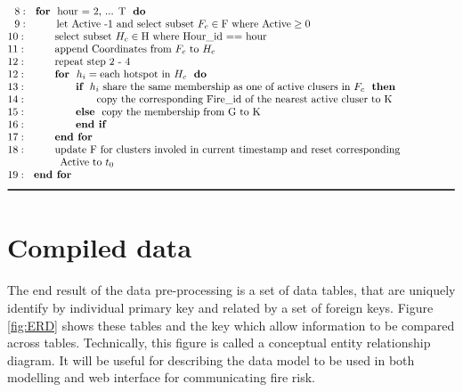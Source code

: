 \documentclass{monashthesis}
\begin{document}
\begin{table}
\begin{align*}
&~~8:~~\textbf{for}~~\text{hour = 2, ... T}~~\textbf{do} \\[-1\jot]
&~~9:~~~~~~~~\text{let Active -1 and select subset }F_c \in \text{F where Active} \geq 0\\[-1\jot]
&10:~~~~~~~~\text{select subset }H_c \in \text{H where Hour\textunderscore id == hour}\\[-1\jot]
&11:~~~~~~~~\text{append Coordinates from }F_c~\text{to}~H_c\\[-1\jot]
&12:~~~~~~~~\text{repeat step 2 - 4}\\[-1\jot]
&12:~~~~~~~~\textbf{for}~~h_i = \text{each hotspot in }H_c~~\textbf{do}\\[-1\jot]
&13:~~~~~~~~~~~~~~\textbf{if}~~h_i~\text{share the same membership as one of active clusers in }F_c~~\textbf{then}\\[-1\jot]
&14:~~~~~~~~~~~~~~~~~~~~\text{copy the corresponding Fire\textunderscore id of the nearest active cluser to K}\\[-1\jot]
&15:~~~~~~~~~~~~~~\textbf{else}~~\text{copy the membership from G to K}\\[-1\jot]
&16:~~~~~~~~~~~~~~\textbf{end if}\\[-1\jot]
&17:~~~~~~~~\textbf{end for}\\[-1\jot]
&18:~~~~~~~~\text{update F for clusters involed in current timestamp and reset corresponding}\\[-1\jot]
&~~~~~~~~~~~~~~~\text{Active to }t_0\\[-1\jot]
&19:~~\textbf{end for}\\[-1\jot]
&\rule{150mm}{0.5mm}
\end{align*}
\end{table}

\section{Compiled data}\label{compiled-data}

The end result of the data pre-processing is a set of data tables, that
are uniquely identify by individual primary key and related by a set of
foreign keys. Figure \ref{fig:ERD} shows these tables and the key which
allow information to be compared across tables. Technically, this figure
is called a conceptual entity relationship diagram. It will be useful
for describing the data model to be used in both modelling and web
interface for communicating fire risk.
\end{document}
